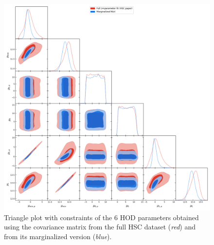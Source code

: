 \documentclass[a4paper,11pt]{article}
\begin{document}
\begin{figure}[ht]
\centering  
\includegraphics[width=1.\textwidth]{./triangle_fid_marg.png}
\caption{Triangle plot with constraints of the 6 HOD parameters obtained using the covariance matrix from the full HSC dataset (\textit{red}) and from its marginalized version (\textit{blue}).}
\label{fig:triangle_fid_marg}
\end{figure}
\end{document}
